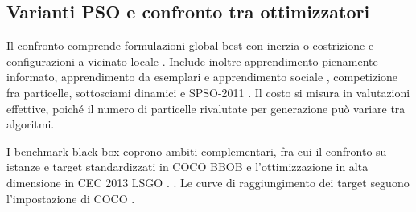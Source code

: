 \subsection{Varianti PSO e confronto tra ottimizzatori}
Il confronto comprende formulazioni global-best con inerzia o costrizione e configurazioni a vicinato locale \citep{ShiEberhart1999,Clerc2002,Bratton2007}. Include inoltre apprendimento pienamente informato, apprendimento da esemplari e apprendimento sociale \citep{MendesKennedyNeves2004,Liang2006CLPSO,ChengJin2015SLPSO}, competizione fra particelle, sottosciami dinamici e SPSO-2011 \citep{Cheng2015,LiangSuganthan2005DMS,ZambranoBigiarini2013}. Il costo si misura in valutazioni effettive, poiché il numero di particelle rivalutate per generazione può variare tra algoritmi.

I benchmark black-box coprono ambiti complementari, fra cui il confronto su istanze e target standardizzati in COCO BBOB e l'ottimizzazione in alta dimensione in CEC 2013 LSGO \citep{Hansen2021,Li2013}.  \citep{Demsar2006,Garcia2010}. Le curve di raggiungimento dei target seguono l'impostazione di COCO \citep{Hansen2016Procedure}.
